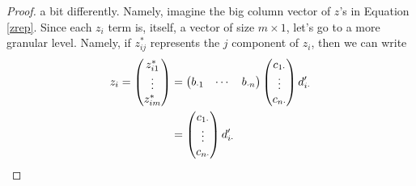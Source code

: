 \documentclass[a4paper,12pt]{scrartcl}
\begin{document}
\begin{proof}
a bit differently. Namely, imagine the
big column vector of $z$'s in Equation \ref{zrep}.
Since each $z_i$ term is, itself, a vector
of size $m\times 1$, let's go to a more
granular level.  Namely, if $z^*_{ij}$ represents
the $j$ component of $z_i$, then we can write
\begin{align*}
    z_i = \begin{pmatrix}
	z^*_{i1} \\ \vdots \\ z^*_{im} \end{pmatrix}
	&= 
	\begin{pmatrix} b_{\cdot 1} & \cdots & b_{\cdot n}
	\end{pmatrix}
	\begin{pmatrix} c_{1\cdot} \\ \vdots \\ c_{n \cdot}
	\end{pmatrix} 
	d'_{i \cdot} \notag \\
    &= 	\begin{pmatrix} c_{1\cdot} \\ \vdots \\ c_{n \cdot}
	\end{pmatrix} 
	d'_{i \cdot} \notag \\
\end{align*}
    





\end{proof}






 

\end{document}
